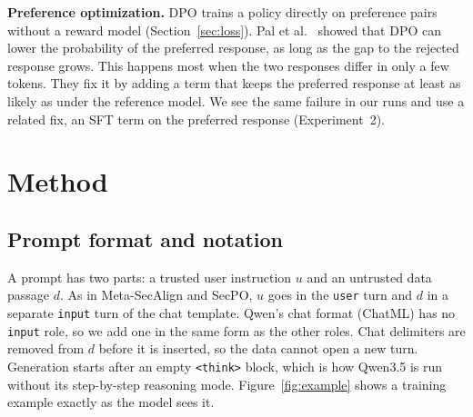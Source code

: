 \documentclass{article}
\begin{document}
\textbf{Preference optimization.} DPO \cite{dpo} trains a policy directly on preference pairs without a reward model (Section~\ref{sec:loss}). Pal et al.\ \cite{dpop} showed that DPO can lower the probability of the preferred response, as long as the gap to the rejected response grows. This happens most when the two responses differ in only a few tokens. They fix it by adding a term that keeps the preferred response at least as likely as under the reference model. We see the same failure in our runs and use a related fix, an SFT term on the preferred response (Experiment~2).

\section{Method}

\subsection{Prompt format and notation}

A prompt has two parts: a trusted user instruction $u$ and an untrusted data passage $d$. As in Meta-SecAlign and SecPO, $u$ goes in the \texttt{user} turn and $d$ in a separate \texttt{input} turn of the chat template. Qwen's chat format (ChatML) has no \texttt{input} role, so we add one in the same form as the other roles. Chat delimiters are removed from $d$ before it is inserted, so the data cannot open a new turn. Generation starts after an empty \texttt{<think>} block, which is how Qwen3.5 is run without its step-by-step reasoning mode. Figure~\ref{fig:example} shows a training example exactly as the model sees it.
\end{document}
